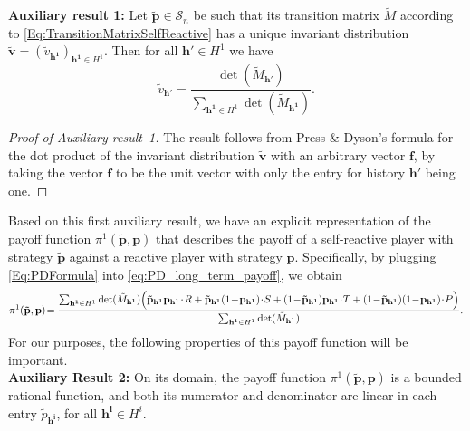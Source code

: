 \documentclass[9pt,twoside,lineno]{pnas-new}
\theoremstyle{plainCl1}
\theoremstyle{plainCl2}
\begin{document}
\noindent
{\bf Auxiliary result 1:}
Let $\mathbf{\tilde p}\!\in\!\mathcal{S}_n$ be such that its transition matrix $\tilde M$ according to \eqref{Eq:TransitionMatrixSelfReactive} has a unique invariant distribution $\mathbf{\tilde v} \!=\! (\tilde v_\mathbf{h^1})_{\mathbf{h^1}\in H^1}$. Then for all $\mathbf{h'}\!\in\!H^1$ we have
\begin{equation} \label{Eq:PDFormula}
\tilde v_\mathbf{h'} = \frac{ \det(\tilde M_{\mathbf{h'}})}{ \sum_{\mathbf{h^1}\in H^1} \det(\tilde M_{\mathbf{h^1}})}.
\end{equation}

\begin{proof}[Proof of Auxiliary result~1]
The result follows from Press \& Dyson's formula for the dot product of the invariant distribution $\mathbf{\tilde v}$ with an arbitrary vector $\mathbf{f}$, by taking the vector $\mathbf{f}$ to be the unit vector with only the entry for history $\mathbf{h'}$ being one. 
\end{proof}

\noindent
Based on this first auxiliary result, we have an explicit representation of the payoff function $\pi^1(\mathbf{\tilde p},\mathbf{p})$ that describes the payoff of a self-reactive player with strategy $\mathbf{\tilde p}$ against a reactive player with strategy $\mathbf{p}$. 
Specifically, by plugging \eqref{Eq:PDFormula} into \eqref{eq:PD_long_term_payoff}, we obtain
\begin{equation} \small
\pi^1(\mathbf{\tilde p},\mathbf{p}) \!=\frac{\sum_{\mathbf{h^1}\in H^1}\det(\tilde M_\mathbf{h^1})
\Big(
\mathbf{\tilde p}_\mathbf{h^1} \mathbf{p}_\mathbf{h^1}\!\cdot\!R +
\mathbf{\tilde p}_\mathbf{h^1} (1\!-\!\mathbf{p}_\mathbf{h^1})\!\cdot\!S +  
(1\!-\!\mathbf{\tilde p}_\mathbf{h^1}) \mathbf{p}_\mathbf{h^1}\!\cdot\!T +
(1\!-\!\mathbf{\tilde p}_\mathbf{h^1}) (1\!-\!\mathbf{p}_\mathbf{h^1})\!\cdot\!P 
\Big)}
{\sum_{\mathbf{h^1}\in H^1} \det(\tilde M_{\mathbf{h^1}})}.
\end{equation}
For our purposes, the following properties of this payoff function will be important.\\

\noindent
{\bf Auxiliary Result 2:}
On its domain, the payoff function $\pi^1(\mathbf{\tilde p},\mathbf{p})$ is a bounded rational function, and both its numerator and denominator are linear in each entry $\tilde p_\mathbf{h^i} $, for all $\mathbf{h^i}\!\in\!H^i$.
\end{document}
